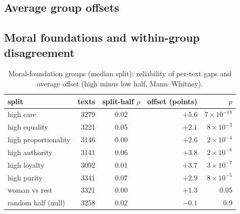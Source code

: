 \subsection{Average group offsets}
\label{sec:groupsignal:offsets}

\begin{figure}[t]
  \centering
  \caption{}
  \label{fig:offsets}
\end{figure}

\subsection{Moral foundations and within-group disagreement}
\label{sec:groupsignal:moral}

\begin{table}[t]
  \centering
  \caption{Moral-foundation groups (median split): reliability of per-text gaps and average offset
    (high minus low half, Mann--Whitney).}
  \label{tab:moral}
  \begin{tabular}{lrcrr}
    \toprule
    split & texts & split-half $\rho$ & offset (points) & $p$ \\
    \midrule
    high care            & \num{3279} & 0.02 & $+5.6$ & $7\times10^{-18}$ \\
    high equality        & \num{3221} & 0.05 & $+2.1$ & $8\times10^{-3}$ \\
    high proportionality & \num{3146} & 0.00 & $+2.6$ & $2\times10^{-4}$ \\
    high authority       & \num{3141} & 0.06 & $+3.8$ & $2\times10^{-8}$ \\
    high loyalty         & \num{3092} & 0.01 & $+3.7$ & $3\times10^{-7}$ \\
    high purity          & \num{3341} & 0.07 & $+2.9$ & $8\times10^{-5}$ \\
    woman vs rest        & \num{3321} & 0.00 & $+1.3$ & 0.05 \\
    \midrule
    random half (null)   & \num{3258} & 0.02 & $-0.1$ & 0.9 \\
    \bottomrule
  \end{tabular}
\end{table}
